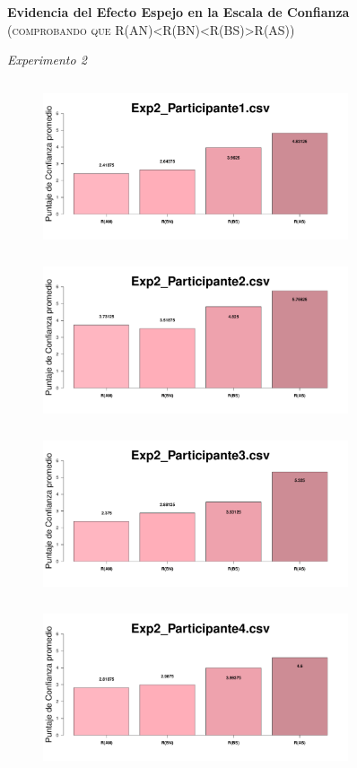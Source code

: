\documentclass[a4paper ]{article}
\begin{document}
\begin{center}
{\LARGE \textbf{Evidencia del Efecto Espejo en la Escala de Confianza}}\\
{\small \textsc{(comprobando que R(AN)<R(BN)<R(BS)>R(AS))}}\\
\smallskip
\end{center}
\begin{center}
{\LARGE \textit{Experimento 2}}\\
\end{center}
\vspace{3mm}
\begin{figure}[th]
\centering
\includegraphics[width=9cm, height=5cm]{Figures/MirrorRating_Exp2_P1} \includegraphics[width=9cm, height=5cm]{Figures/MirrorRating_Exp2_P2} 
\includegraphics[width=9cm, height=5cm]{Figures/MirrorRating_Exp2_P3} \includegraphics[width=9cm, height=5cm]{Figures/MirrorRating_Exp2_P4} 

\end{figure}
\end{document}

